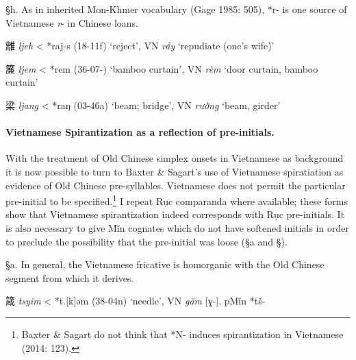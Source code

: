 §h. As in inherited Mon-Khmer vocabulary (Gage 1985: 505), *r- is one
source of Vietnamese \emph{r}- in Chinese loans.

\begin{description} \item
離  \emph{ljeh} \textless{} *raj-s (18-11f) `reject', VN \emph{rẫy}
`repudiate (one's wife)'
\end{description}

\begin{description} \item
簾 \emph{ljem} \textless{} *rem (36-07-) `bamboo curtain', VN \emph{rèm}
`door curtain, bamboo curtain'

\item
梁 \emph{ljang} \textless{} *raŋ (03-46a) `beam; bridge', VN
\emph{rường} `beam, girder'
\end{description}

\paragraph{Vietnamese Spirantization as a
reflection of pre-initials.} With the treatment of Old Chinese simplex
onsets in Vietnamese as background it is now possible to turn to Baxter
\& Sagart's use of Vietnamese spiratiation as evidence of Old Chinese
pre-syllables. Vietnamese does not permit the particular pre-initial to
be specified.\footnote{Baxter \& Sagart do not think that *N- induces
  spirantization in Vietnamese (2014: 123).} I repeat Rục comparanda
where available; these forms show that Vietnamese spirantization indeed
corresponds with Rục pre-initials. It is also necessary to give Mǐn
cognates which do not have softened initials in order to preclude the
possibility that the pre-initial was loose (§a and §).

§a. In general, the Vietnamese fricative is homorganic with the Old
Chinese segment from which it derives.

\begin{description} \item
箴 \emph{tsyim} \textless{} *t.{[}k]əm (38-04n) `needle', VN
 \emph{găm} {[}ɣ-], pMǐn *tš-
\end{description}

